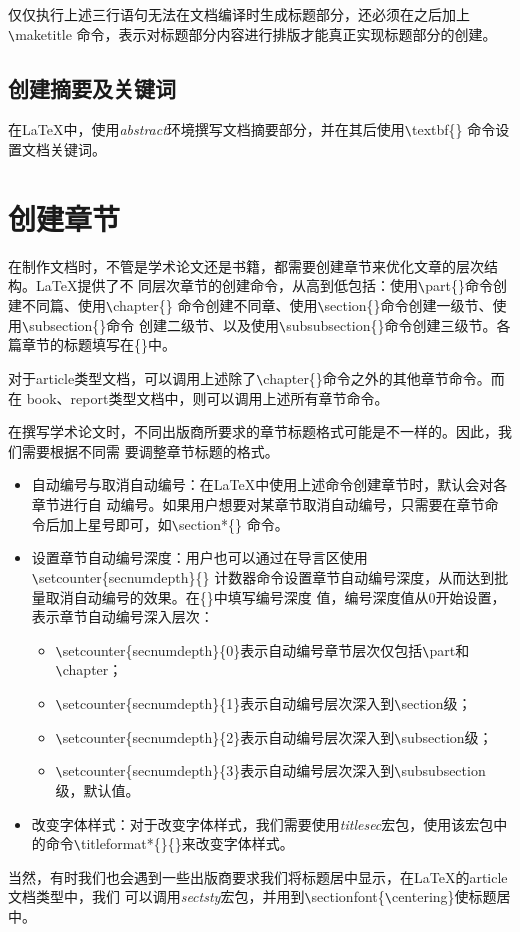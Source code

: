 仅仅执行上述三行语句无法在文档编译时生成标题部分，还必须在之后加上\verb|\|maketitle
命令，表示对标题部分内容进行排版才能真正实现标题部分的创建。

\subsection{创建摘要及关键词}
在LaTeX中，使用\emph{abstract}环境撰写文档摘要部分，并在其后使用\verb|\|textbf\{\}
命令设置文档关键词。

\section{创建章节}
在制作文档时，不管是学术论文还是书籍，都需要创建章节来优化文章的层次结构。LaTeX提供了不
同层次章节的创建命令，从高到低包括：使用\verb|\|part\{\}命令创建不同篇、使用\verb|\|chapter\{\}
命令创建不同章、使用\verb|\|section\{\}命令创建一级节、使用\verb|\|subsection\{\}命令
创建二级节、以及使用\verb|\|subsubsection\{\}命令创建三级节。各篇章节的标题填写在\{\}中。

对于article类型文档，可以调用上述除了\verb|\|chapter\{\}命令之外的其他章节命令。而在
book、report类型文档中，则可以调用上述所有章节命令。

在撰写学术论文时，不同出版商所要求的章节标题格式可能是不一样的。因此，我们需要根据不同需
要调整章节标题的格式。

\begin{itemize}
    \item 自动编号与取消自动编号：在LaTeX中使用上述命令创建章节时，默认会对各章节进行自
          动编号。如果用户想要对某章节取消自动编号，只需要在章节命令后加上星号即可，如\verb|\|section*\{\}
          命令。
    \item 设置章节自动编号深度：用户也可以通过在导言区使用\verb|\|setcounter\{secnumdepth\}\{\}
          计数器命令设置章节自动编号深度，从而达到批量取消自动编号的效果。在\{\}中填写编号深度
          值，编号深度值从0开始设置，表示章节自动编号深入层次：
          \begin{itemize}
              \item \verb|\|setcounter\{secnumdepth\}\{0\}表示自动编号章节层次仅包括\verb|\|part和\verb|\|chapter；
              \item \verb|\|setcounter\{secnumdepth\}\{1\}表示自动编号层次深入到\verb|\|section级；
              \item \verb|\|setcounter\{secnumdepth\}\{2\}表示自动编号层次深入到\verb|\|subsection级；
              \item \verb|\|setcounter\{secnumdepth\}\{3\}表示自动编号层次深入到\verb|\|subsubsection级，默认值。
          \end{itemize}
    \item 改变字体样式：对于改变字体样式，我们需要使用\emph{titlesec}宏包，使用该宏包中
          的命令\verb|\|titleformat*\{\}\{\}来改变字体样式。
\end{itemize}

当然，有时我们也会遇到一些出版商要求我们将标题居中显示，在LaTeX的article文档类型中，我们
可以调用\emph{sectsty}宏包，并用到\verb|\|sectionfont\{\verb|\|centering\}使标题居中。